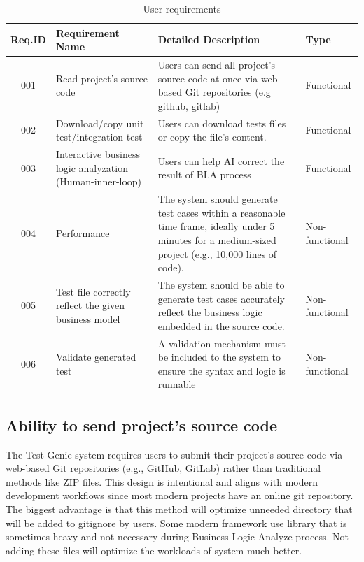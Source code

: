 \begin{table}[H]
	\centering
	\small
	\begin{tabular}{|c|p{2.5cm}|p{7.5cm}|p{2cm}|}
		\hline
		\textbf{Req.ID} & \textbf{Requirement Name} & \textbf{Detailed Description} & \textbf{Type} \\ \hline
		001 & Read project's source code & Users can send all project's source code at once via web-based Git repositories (e.g github, gitlab) & Functional \\ \hline
		002 & Download/copy unit test/integration test & Users can download tests files or copy the file's content. & Functional \\ \hline
		003 & Interactive business logic analyzation (Human-inner-loop) & Users can help AI correct the result of BLA process & Functional \\ \hline
		004 & Performance & The system should generate test cases within a reasonable time frame, ideally under 5 minutes for a medium-sized project (e.g., 10,000 lines of code). & Non-functional \\ \hline
		005 & Test file correctly reflect the given business model & The system should be able to generate test cases accurately reflect the business logic embedded in the source code. & Non-functional \\ \hline
		006 & Validate generated test & A validation mechanism must be included to the system to ensure the syntax and logic is runnable & Non-functional \\ \hline
	\end{tabular}
	\caption{User requirements}
	\label{tab:user-requirements}
\end{table}

\subsection{Ability to send project's source code}
\hspace{0.5cm}The Test Genie system requires users to submit their project's source code via web-based Git repositories (e.g., GitHub, GitLab) rather than traditional methods like ZIP files. This design is intentional and aligns with modern development workflows since most modern projects have an online git repository. The biggest advantage is that this method will optimize unneeded directory that will be added to gitignore by users. Some modern framework use library that is sometimes heavy and not necessary during Business Logic Analyze process. Not adding these files will optimize the workloads of system much better.

